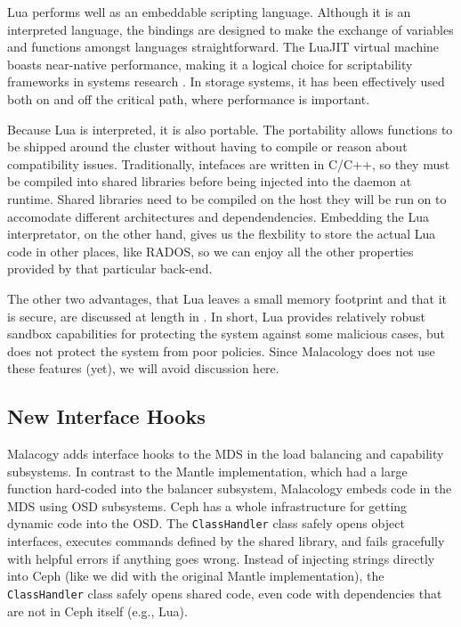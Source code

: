 \documentclass[10pt,twocolumn]{article}
\begin{document}
Lua performs well as an embeddable scripting language. Although it is an
interpreted language, the bindings are designed to make the exchange of
variables and functions amongst languages straightforward. The LuaJIT
virtual machine boasts near-native performance, making it a logical
choice for scriptability frameworks in systems research
\autocite{neto:dls14-luaos}. In storage systems, it has been effectively
used both on \autocites[
]{grawinkel:pdsw2012-lua}{watkins2013:bdmc13-in-vivo} and off
\autocite{sevilla:sc15-mantle} the critical path, where performance is
important.

Because Lua is interpreted, it is also portable. The portability allows
functions to be shipped around the cluster without having to compile or
reason about compatibility issues. Traditionally, intefaces are written
in C/C++, so they must be compiled into shared libraries before being
injected into the daemon at runtime. Shared libraries need to be
compiled on the host they will be run on to accomodate different
architectures and dependendencies. Embedding the Lua interpretator, on
the other hand, gives us the flexbility to store the actual Lua code in
other places, like RADOS, so we can enjoy all the other properties
provided by that particular back-end.

The other two advantages, that Lua leaves a small memory footprint and
that it is secure, are discussed at length in \autocites[
]{ierusalimschy_programming_2006}{neto:dls14-luaos}. In short, Lua
provides relatively robust sandbox capabilities for protecting the
system against some malicious cases, but does not protect the system
from poor policies. Since Malacology does not use these features (yet),
we will avoid discussion here.

\subsection{New Interface Hooks}\label{new-interface-hooks}

Malacogy adds interface hooks to the MDS in the load balancing and
capability subsystems. In contrast to the Mantle implementation, which
had a large function hard-coded into the balancer subsystem, Malacology
embeds code in the MDS using OSD subsystems. Ceph has a whole
infrastructure for getting dynamic code into the OSD. The
\texttt{ClassHandler} class safely opens object interfaces, executes
commands defined by the shared library, and fails gracefully with
helpful errors if anything goes wrong. Instead of injecting strings
directly into Ceph (like we did with the original Mantle
implementation), the \texttt{ClassHandler} class safely opens shared
code, even code with dependencies that are not in Ceph itself (e.g.,
Lua).
\end{document}
